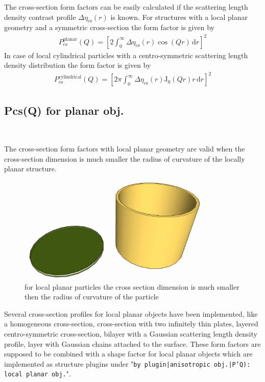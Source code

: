 The cross-section form factors can be easily calculated if the
scattering length density contrast profile
$\Delta\eta_\textrm{cs}(r)$ is known. For structures with a local
planar geometry and a symmetric cross-section the form factor is
given by
\begin{align}
P_\textrm{cs}^\textrm{planar} (Q) = \left[2\int_0^\infty
\Delta\eta_\textrm{cs}(r) \cos(Qr) \, \textrm{d}r\right]^2
\label{Pcs:planar}
\end{align}
In case of local cylindrical particles with a centro-symmetric
scattering length density distribution the form factor is given by
\begin{align}
P_\textrm{cs}^\textrm{cylindrical} (Q) = \left[2\pi\int_0^\infty
\Delta\eta_\textrm{cs}(r) \textrm{J}_0(Qr)r \,
\textrm{d}r\right]^2 \label{Pcs:cylindrical}
\end{align}

\clearpage
\subsection{Pcs(Q) for planar obj.} ~\\
\label{plugin:Pcs4planar}

The cross-section form factors with local planar geometry are valid
when the cross-section dimension is much smaller the radius of curvature
of the locally planar structure.
\begin{figure}[htb]
\begin{center}
\includegraphics[width=0.838\textwidth,height=0.456\textwidth]{../images/form_factor/anisotropic/localplanar.png}
\end{center}
\caption{for local planar particles the cross section dimension is much smaller then the
radius of curvature of the particle}
\label{fig:localplanar}
\end{figure}

Several cross-section profiles for local planar objects have been implemented,
like a homogeneous cross-section,
cross-section with two infinitely thin plates,
layered centro-symmetric cross-section,
bilayer with a Gaussian scattering length density profile,
layer with Gaussian chains attached to the surface.
These form factors are supposed to be combined with a shape factor for
local planar objects which are implemented as structure  plugins
under "\texttt{by plugin|anisotropic obj.|P'Q): local planar
obj.}".

